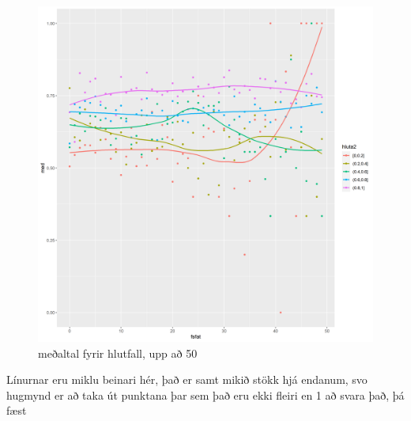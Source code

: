 \documentclass[
  12pt,
]{article}
\begin{document}
\begin{figure}[H]

{\centering \includegraphics[width=1\linewidth]{Img/meanbyhlutfall} 

}

\caption{meðaltal fyrir hlutfall, upp að 50}\label{fig:meanbyhlutfall50}
\end{figure}

Línurnar eru miklu beinari hér, það er samt mikið stökk hjá endanum, svo hugmynd er að taka út punktana þar sem það eru ekki fleiri en 1 að svara það, þá fæst
\end{document}
